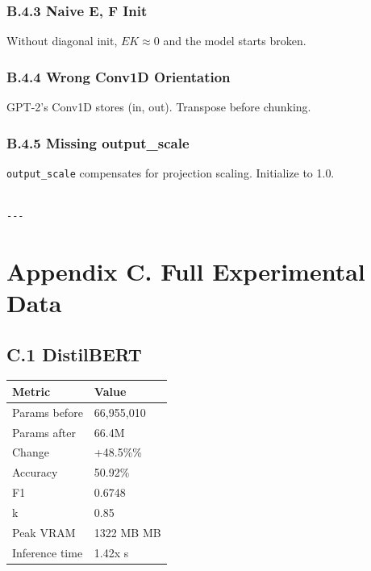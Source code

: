 \subsubsection{B.4.3 Naive E, F Init}

Without diagonal init, $E K \approx 0$ and the model starts broken.

\subsubsection{B.4.4 Wrong Conv1D Orientation}

GPT-2's Conv1D stores (in, out). Transpose before chunking.

\subsubsection{B.4.5 Missing output\_scale}

\texttt{output\_scale} compensates for projection scaling. Initialize to 1.0.
\begin{lstlisting}

---
\end{lstlisting}

\section{Appendix C. Full Experimental Data}

\subsection{C.1 DistilBERT}

\begin{table}[H]
\centering
\small
\begin{tabular}{ll}
\toprule
\textbf{Metric} & \textbf{Value} \\
\midrule
Params before & 66,955,010 \\
Params after & 66.4M \\
Change & +48.5\%\% \\
Accuracy & 50.92\% \\
F1 & 0.6748 \\
k & 0.85 \\
Peak VRAM & 1322 MB MB \\
Inference time & 1.42x s \\
\bottomrule
\end{tabular}
\end{table}

